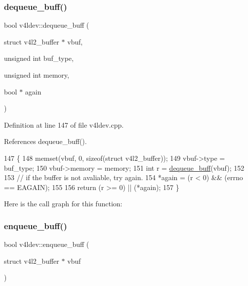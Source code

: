 \subsubsection{\texorpdfstring{dequeue\+\_\+buff()}{dequeue\_buff()}\hspace{0.1cm}{\footnotesize\ttfamily [2/2]}}
{\footnotesize\ttfamily bool v4ldev\+::dequeue\+\_\+buff (\begin{DoxyParamCaption}\item[{struct v4l2\+\_\+buffer $\ast$}]{vbuf,  }\item[{unsigned int}]{buf\+\_\+type,  }\item[{unsigned int}]{memory,  }\item[{bool $\ast$}]{again }\end{DoxyParamCaption})}



Definition at line 147 of file v4ldev.\+cpp.



References dequeue\+\_\+buff().


\begin{DoxyCode}
147                                                                                                            
        \{
148     memset(vbuf, 0, \textcolor{keyword}{sizeof}(\textcolor{keyword}{struct} v4l2\_buffer));
149     vbuf->type = buf\_type;
150     vbuf->memory = memory;
151     \textcolor{keywordtype}{int} r = \hyperlink{classv4ldev_a539e3edba551564e19bd1ae21c0cdb26}{dequeue\_buff}(vbuf);
152 
153     \textcolor{comment}{// if the buffer is not avaliable, try again.}
154     *again = (r < 0) && (errno == EAGAIN);
155 
156     \textcolor{keywordflow}{return} (r >= 0) || (*again);
157 \}
\end{DoxyCode}
Here is the call graph for this function\+:
\mbox{\label{classv4ldev_ae53ad5fcd680c9df8e7f2f564e575a35}} 
\subsubsection{\texorpdfstring{enqueue\+\_\+buff()}{enqueue\_buff()}\hspace{0.1cm}{\footnotesize\ttfamily [1/2]}}
{\footnotesize\ttfamily bool v4ldev\+::enqueue\+\_\+buff (\begin{DoxyParamCaption}\item[{struct v4l2\+\_\+buffer $\ast$}]{vbuf }\end{DoxyParamCaption})}



